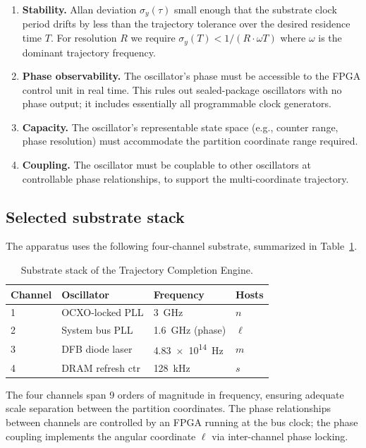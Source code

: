 \documentclass[twocolumn,11pt,a4paper]{article}
\theoremstyle{definition}
\theoremstyle{remark}
\begin{document}
\begin{enumerate}[nosep]
    \item \textbf{Stability.} Allan deviation $\sigma_y(\tau)$ small enough that the substrate clock period drifts by less than the trajectory tolerance over the desired residence time $T$. For resolution $R$ we require $\sigma_y(T) < 1/(R \cdot \omega T)$ where $\omega$ is the dominant trajectory frequency.
    \item \textbf{Phase observability.} The oscillator's phase must be accessible to the FPGA control unit in real time. This rules out sealed-package oscillators with no phase output; it includes essentially all programmable clock generators.
    \item \textbf{Capacity.} The oscillator's representable state space (e.g., counter range, phase resolution) must accommodate the partition coordinate range required.
    \item \textbf{Coupling.} The oscillator must be couplable to other oscillators at controllable phase relationships, to support the multi-coordinate trajectory.
\end{enumerate}

\subsection{Selected substrate stack}

The apparatus uses the following four-channel substrate, summarized in Table~\ref{tab:substrate}.

\begin{table}[H]
\centering
\caption{Substrate stack of the Trajectory Completion Engine.}
\label{tab:substrate}
\small
\begin{tabular}{llll}
\toprule
\textbf{Channel} & \textbf{Oscillator} & \textbf{Frequency} & \textbf{Hosts} \\
\midrule
1 & OCXO-locked PLL & \SI{3}{GHz} & $n$ \\
2 & System bus PLL & \SI{1.6}{GHz} (phase) & $\ell$ \\
3 & DFB diode laser & \SI{4.83e14}{Hz} & $m$ \\
4 & DRAM refresh ctr & \SI{128}{kHz} & $s$ \\
\bottomrule
\end{tabular}
\end{table}

The four channels span 9 orders of magnitude in frequency, ensuring adequate scale separation between the partition coordinates. The phase relationships between channels are controlled by an FPGA running at the bus clock; the phase coupling implements the angular coordinate $\ell$ via inter-channel phase locking.
\end{document}
